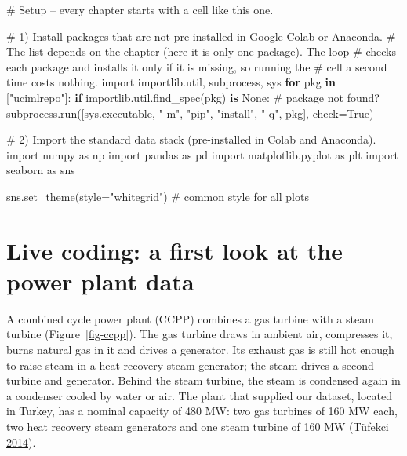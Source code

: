 \documentclass[
  letterpaper,
  DIV=11,
  numbers=noendperiod]{scrreprt}
\newenvironment{Shaded}{\begin{snugshade}}{\end{snugshade}}
\newcommand{\CommentTok}[1]{\textcolor[rgb]{0.37,0.37,0.37}{#1}}
\newcommand{\ControlFlowTok}[1]{\textcolor[rgb]{0.00,0.23,0.31}{\textbf{#1}}}
\newcommand{\ImportTok}[1]{\textcolor[rgb]{0.00,0.46,0.62}{#1}}
\newcommand{\KeywordTok}[1]{\textcolor[rgb]{0.00,0.23,0.31}{\textbf{#1}}}
\newcommand{\NormalTok}[1]{\textcolor[rgb]{0.00,0.23,0.31}{#1}}
\newcommand{\OperatorTok}[1]{\textcolor[rgb]{0.37,0.37,0.37}{#1}}
\newcommand{\StringTok}[1]{\textcolor[rgb]{0.13,0.47,0.30}{#1}}
\newcommand{\VariableTok}[1]{\textcolor[rgb]{0.07,0.07,0.07}{#1}}
\begin{document}
\begin{Shaded}
\begin{Highlighting}[]
\CommentTok{\# Setup – every chapter starts with a cell like this one.}

\CommentTok{\# 1) Install packages that are not pre{-}installed in Google Colab or Anaconda.}
\CommentTok{\#    The list depends on the chapter (here it is only one package). The loop}
\CommentTok{\#    checks each package and installs it only if it is missing, so running the}
\CommentTok{\#    cell a second time costs nothing.}
\ImportTok{import}\NormalTok{ importlib.util, subprocess, sys}
\ControlFlowTok{for}\NormalTok{ pkg }\KeywordTok{in}\NormalTok{ [}\StringTok{"ucimlrepo"}\NormalTok{]:}
    \ControlFlowTok{if}\NormalTok{ importlib.util.find\_spec(pkg) }\KeywordTok{is} \VariableTok{None}\NormalTok{:        }\CommentTok{\# package not found?}
\NormalTok{        subprocess.run([sys.executable, }\StringTok{"{-}m"}\NormalTok{, }\StringTok{"pip"}\NormalTok{, }\StringTok{"install"}\NormalTok{, }\StringTok{"{-}q"}\NormalTok{, pkg], check}\OperatorTok{=}\VariableTok{True}\NormalTok{)}

\CommentTok{\# 2) Import the standard data stack (pre{-}installed in Colab and Anaconda).}
\ImportTok{import}\NormalTok{ numpy }\ImportTok{as}\NormalTok{ np}
\ImportTok{import}\NormalTok{ pandas }\ImportTok{as}\NormalTok{ pd}
\ImportTok{import}\NormalTok{ matplotlib.pyplot }\ImportTok{as}\NormalTok{ plt}
\ImportTok{import}\NormalTok{ seaborn }\ImportTok{as}\NormalTok{ sns}

\NormalTok{sns.set\_theme(style}\OperatorTok{=}\StringTok{"whitegrid"}\NormalTok{)                     }\CommentTok{\# common style for all plots}
\end{Highlighting}
\end{Shaded}

\section{Live coding: a first look at the power plant
data}\label{live-coding-a-first-look-at-the-power-plant-data}

A combined cycle power plant (CCPP) combines a gas turbine with a steam
turbine (Figure~\ref{fig-ccpp}). The gas turbine draws in ambient air,
compresses it, burns natural gas in it and drives a generator. Its
exhaust gas is still hot enough to raise steam in a heat recovery steam
generator; the steam drives a second turbine and generator. Behind the
steam turbine, the steam is condensed again in a condenser cooled by
water or air. The plant that supplied our dataset, located in Turkey,
has a nominal capacity of 480 MW: two gas turbines of 160 MW each, two
heat recovery steam generators and one steam turbine of 160 MW
(\href{https://doi.org/10.1016/j.ijepes.2014.02.027}{Tüfekci 2014}).
\end{document}
